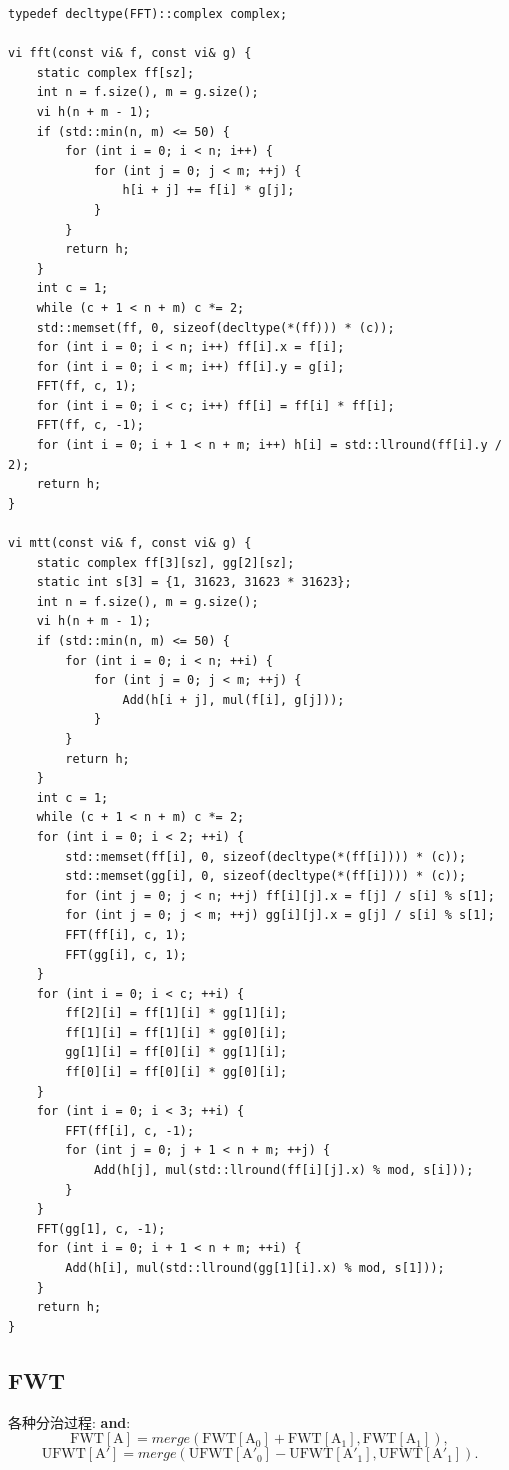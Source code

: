 \documentclass[UTF8, a4paper, titlepage, twoside]{ctexart}
\begin{document}
\begin{lstlisting}[style=cpp]
typedef decltype(FFT)::complex complex;

vi fft(const vi& f, const vi& g) {
    static complex ff[sz];
    int n = f.size(), m = g.size();
    vi h(n + m - 1);
    if (std::min(n, m) <= 50) {
        for (int i = 0; i < n; i++) {
            for (int j = 0; j < m; ++j) {
                h[i + j] += f[i] * g[j];
            }
        }
        return h;
    }
    int c = 1;
    while (c + 1 < n + m) c *= 2;
    std::memset(ff, 0, sizeof(decltype(*(ff))) * (c));
    for (int i = 0; i < n; i++) ff[i].x = f[i];
    for (int i = 0; i < m; i++) ff[i].y = g[i];
    FFT(ff, c, 1);
    for (int i = 0; i < c; i++) ff[i] = ff[i] * ff[i];
    FFT(ff, c, -1);
    for (int i = 0; i + 1 < n + m; i++) h[i] = std::llround(ff[i].y / 2);
    return h;
}

vi mtt(const vi& f, const vi& g) {
    static complex ff[3][sz], gg[2][sz];
    static int s[3] = {1, 31623, 31623 * 31623};
    int n = f.size(), m = g.size();
    vi h(n + m - 1);
    if (std::min(n, m) <= 50) {
        for (int i = 0; i < n; ++i) {
            for (int j = 0; j < m; ++j) {
                Add(h[i + j], mul(f[i], g[j]));
            }
        }
        return h;
    }
    int c = 1;
    while (c + 1 < n + m) c *= 2;
    for (int i = 0; i < 2; ++i) {
        std::memset(ff[i], 0, sizeof(decltype(*(ff[i]))) * (c));
        std::memset(gg[i], 0, sizeof(decltype(*(ff[i]))) * (c));
        for (int j = 0; j < n; ++j) ff[i][j].x = f[j] / s[i] % s[1];
        for (int j = 0; j < m; ++j) gg[i][j].x = g[j] / s[i] % s[1];
        FFT(ff[i], c, 1);
        FFT(gg[i], c, 1);
    }
    for (int i = 0; i < c; ++i) {
        ff[2][i] = ff[1][i] * gg[1][i];
        ff[1][i] = ff[1][i] * gg[0][i];
        gg[1][i] = ff[0][i] * gg[1][i];
        ff[0][i] = ff[0][i] * gg[0][i];
    }
    for (int i = 0; i < 3; ++i) {
        FFT(ff[i], c, -1);
        for (int j = 0; j + 1 < n + m; ++j) {
            Add(h[j], mul(std::llround(ff[i][j].x) % mod, s[i]));
        }
    }
    FFT(gg[1], c, -1);
    for (int i = 0; i + 1 < n + m; ++i) {
        Add(h[i], mul(std::llround(gg[1][i].x) % mod, s[1]));
    }
    return h;
}
\end{lstlisting}

\subsection{ FWT }
各种分治过程:
\textbf{and}:
\[
    \operatorname{FWT[A]} = merge(\operatorname{FWT[A_0]} + \operatorname{FWT[A_1]}, \operatorname{FWT[A_1]}),
\]
\[
    \operatorname{UFWT[A']} = merge(\operatorname{UFWT[A'_0]} - \operatorname{UFWT[A'_1]}, \operatorname{UFWT[A'_1]}).
\]
\end{document}
